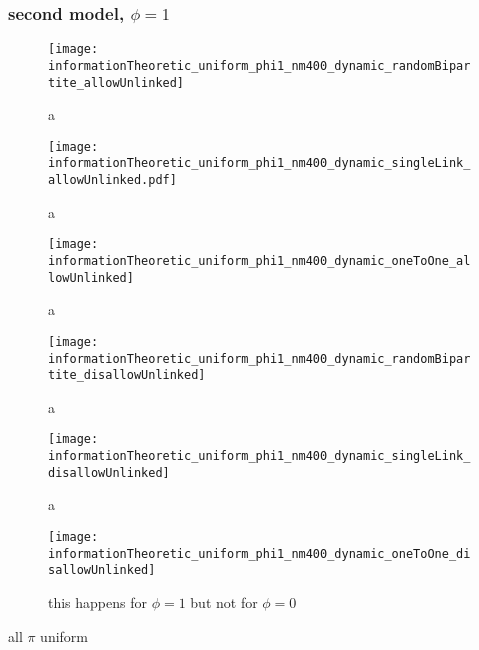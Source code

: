 \subsubsection{second model, $\phi=1$}

\begin{figure}
  \centering
  \texttt{[image: informationTheoretic\_uniform\_phi1\_nm400\_dynamic\_randomBipartite\_allowUnlinked]}
  \caption{a}
  \label{fig:informationTheoretic_uniform_phi1_nm400_dynamic_randomBipartite_allowUnlinked}
\end{figure}

\begin{figure}
  \centering
  \texttt{[image: informationTheoretic\_uniform\_phi1\_nm400\_dynamic\_singleLink\_allowUnlinked.pdf]}
  \caption{a}
  \label{fig:informationTheoretic_uniform_phi1_nm400_dynamic_singleLink_allowUnlinked}
\end{figure}

\begin{figure}
  \centering
  \texttt{[image: informationTheoretic\_uniform\_phi1\_nm400\_dynamic\_oneToOne\_allowUnlinked]}
  \caption{a}
  \label{fig:informationTheoretic_uniform_phi1_nm400_dynamic_oneToOne_allowUnlinked}
\end{figure}

\begin{figure}
  \centering
  \texttt{[image: informationTheoretic\_uniform\_phi1\_nm400\_dynamic\_randomBipartite\_disallowUnlinked]}
  \caption{a}
  \label{fig:informationTheoretic_uniform_phi1_nm400_dynamic_randomBipartite_disallowUnlinked}
\end{figure}

\begin{figure}
  \centering
  \texttt{[image: informationTheoretic\_uniform\_phi1\_nm400\_dynamic\_singleLink\_disallowUnlinked]}
  \caption{a}
  \label{fig:informationTheoretic_uniform_phi1_nm400_dynamic_singleLink_disallowUnlinked}
\end{figure}

\begin{figure}
  \centering
  \texttt{[image: informationTheoretic\_uniform\_phi1\_nm400\_dynamic\_oneToOne\_disallowUnlinked]}
  \caption{this happens for $\phi=1$ but not for $\phi=0$}
  \label{fig:informationTheoretic_uniform_phi1_nm400_dynamic_oneToOne_disallowUnlinked}
\end{figure}

all $\pi$ uniform

